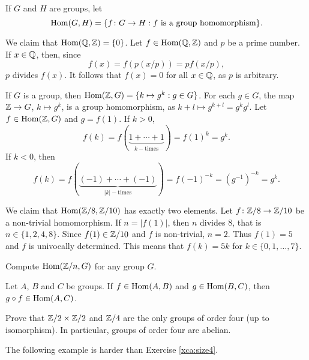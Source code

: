 If $G$ and $H$ are groups, let 
\[
\operatorname{Hom}(G,H)=\{f\colon G\to H:f\text{ is a group homomorphism}\}.
\]

\begin{example}
We claim that 
$\operatorname{Hom}(\mathbb{Q},\mathbb{Z})=\{0\}$. Let $f\in\operatorname{Hom}(\mathbb{Q},\mathbb{Z})$ and $p$ be a prime number. 
If $x\in\mathbb{Q}$, then, since 
\[
f(x)=f\left(p(x/p)\right)=pf(x/p),
\]
$p$ divides $f(x)$. It follows that $f(x)=0$ for all
$x\in\mathbb{Q}$, as $p$ is arbitrary. 
\end{example}

\begin{example}
If $G$ is a group, then $\operatorname{Hom}(\mathbb{Z},G)=\{k\mapsto g^k:g\in G\}$.
For each $g\in G$, the map $\mathbb{Z}\to G$, $k\mapsto g^k$, is a group
homomorphism, as 
$k+l\mapsto g^{k+l}=g^kg^l$. Let $f\in\operatorname{Hom}(\mathbb{Z},G)$ and  $g=f(1)$. If $k>0$,
\[
f(k)=f(\underbrace{1+\cdots+1}_{k-\text{times}})=f(1)^k=g^k.
\]
If $k<0$, then
\[
f(k)=f(\underbrace{(-1)+\cdots+(-1)}_{|k|-\text{times}})=f(-1)^{-k}=(g^{-1})^{-k}=g^k.
\]
\end{example}

\begin{example}
We claim that $\operatorname{Hom}(\mathbb{Z}/8,\mathbb{Z}/10)$ has exactly two elements.
Let $f\colon\mathbb{Z}/8\to\mathbb{Z}/10$ be a non-trivial homomorphism. If 
$n=|f(1)|$, then 
$n$ divides $8$, that is $n\in\{1,2,4,8\}$. Since $f(1)\in\mathbb{Z}/10$ and
$f$ is non-trivial,
$n=2$. Thus $f(1)=5$ and $f$ is univocally determined. 
This means that 
$f(k)=5k$ for $k\in\{0,1,\dots,7\}$.
\end{example}

\begin{exercise}
Compute $\operatorname{Hom}(\mathbb{Z}/n,G)$ for any group $G$.
\end{exercise}

\begin{exercise}
Let $A$, $B$ and $C$ be groups. If $f\in\operatorname{Hom}(A,B)$ and $g\in\operatorname{Hom}(B,C)$,
then $g\circ f\in\operatorname{Hom}(A,C)$.
\end{exercise}

\begin{exercise}
\label{xca:size4}
Prove that $\mathbb{Z}/2\times\mathbb{Z}/2$ and $\mathbb{Z}/4$ are 
the only groups of order four (up to isomorphism). In particular, 
groups of order four are abelian. 
\end{exercise}

The following example is harder than
Exercise \ref{xca:size4}.

